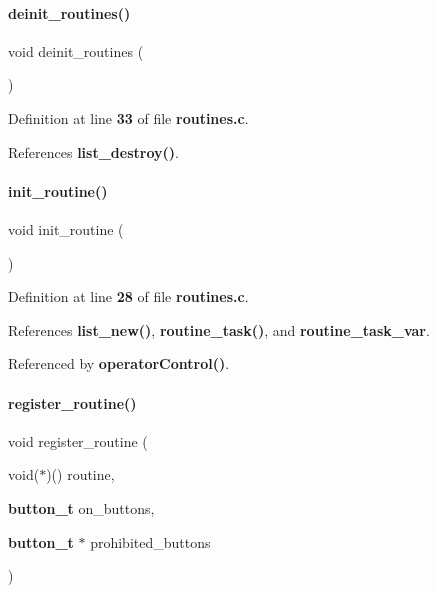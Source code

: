 \paragraph{deinit\+\_\+routines()}
{\footnotesize\ttfamily void deinit\+\_\+routines (\begin{DoxyParamCaption}{ }\end{DoxyParamCaption})}



Definition at line \textbf{ 33} of file \textbf{ routines.\+c}.



References \textbf{ list\+\_\+destroy()}.

\mbox{\label{routines_8c_ab873e24fcc59a2bf7844618b664a5d26}} 
\paragraph{init\+\_\+routine()}
{\footnotesize\ttfamily void init\+\_\+routine (\begin{DoxyParamCaption}{ }\end{DoxyParamCaption})}



Definition at line \textbf{ 28} of file \textbf{ routines.\+c}.



References \textbf{ list\+\_\+new()}, \textbf{ routine\+\_\+task()}, and \textbf{ routine\+\_\+task\+\_\+var}.



Referenced by \textbf{ operator\+Control()}.

\mbox{\label{routines_8c_a4bf3e235fcde5f0e1ce1f693cbb9c01c}} 
\paragraph{register\+\_\+routine()}
{\footnotesize\ttfamily void register\+\_\+routine (\begin{DoxyParamCaption}\item[{void($\ast$)()}]{routine,  }\item[{\textbf{ button\+\_\+t}}]{on\+\_\+buttons,  }\item[{\textbf{ button\+\_\+t} $\ast$}]{prohibited\+\_\+buttons }\end{DoxyParamCaption})}



